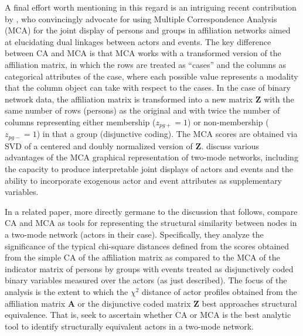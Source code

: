 A final effort worth mentioning in this regard is an intriguing recent contribution by \citet{desposito2014use}, who convincingly advocate for using Multiple Correspondence Analysis (MCA) for the joint display of persons and groups in affiliation networks aimed at elucidating dual linkages between actors and events. The key difference between CA and MCA is that MCA works with a transformed version of the affiliation matrix, in which the rows are treated as ``cases'' and the columns as categorical attributes of the case, where each possible value represents a modality that the column object can take with respect to the cases. In the case of binary network data, the affiliation matrix is transformed into a new matrix $\mathbf{Z}$ with the same number of rows (persons) as the original and with twice the number of columns representing either membership ($z_{pg+} = 1$) or non-membership ($z_{pg-} = 1$) in that a group (disjunctive coding). The MCA scores are obtained via SVD of a centered and doubly normalized version of $\mathbf{Z}$. \citet{desposito2014use} discuss various advantages of the MCA graphical representation of two-mode networks, including the capacity to produce interpretable joint displays of actors and events and the ability to incorporate exogenous actor and event attributes as supplementary variables. 

In a related paper, more directly germane to the discussion that follows, \citet{desposito2014comparison} compare CA and MCA as tools for representing the structural similarity between nodes in a two-mode network (actors in their case). Specifically, they analyze the significance of the typical chi-square distances defined from the scores obtained from the simple CA of the affiliation matrix as compared to the MCA of the indicator matrix of persons by groups with events treated as disjunctively coded binary variables measured over the actors (as just described). The focus of the analysis is the extent to which the $\chi^2$ distance of actor profiles obtained from the affiliation matrix $\mathbf{A}$ or the disjunctive coded matrix $\mathbf{Z}$ best approaches structural equivalence. That is, \citet{desposito2014comparison} seek to ascertain whether CA or MCA is the best analytic tool to identify structurally equivalent actors in a two-mode network.  

